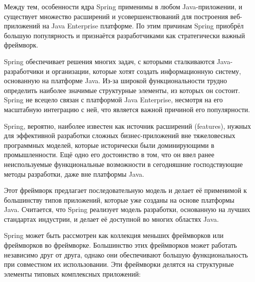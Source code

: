 Между тем, особенности ядра Spring применимы в любом Java-приложении, и существует множество расширений и усовершенствований для построения веб-приложений на Java Enterprise платформе. По этим причинам Spring приобрёл большую популярность и признаётся разработчиками как стратегически важный фреймворк.

Spring обеспечивает решения многих задач, с которыми сталкиваются Java-разработчики и организации, которые хотят создать информационную систему, основанную на платформе Java. Из-за широкой функциональности трудно определить наиболее значимые структурные элементы, из которых он состоит. Spring не всецело связан с платформой Java Enterprise, несмотря на его масштабную интеграцию с ней, что является важной причиной его популярности.

Spring, вероятно, наиболее известен как источник расширений (features), нужных для эффективной разработки сложных бизнес-приложений вне тяжеловесных программных моделей, которые исторически были доминирующими в промышленности. Ещё одно его достоинство в том, что он ввел ранее неиспользуемые функциональные возможности в сегодняшние господствующие методы разработки, даже вне платформы Java.

Этот фреймворк предлагает последовательную модель и делает её применимой к большинству типов приложений, которые уже созданы на основе платформы Java. Считается, что Spring реализует модель разработки, основанную на лучших стандартах индустрии, и делает её доступной во многих областях Java.

Spring может быть рассмотрен как коллекция меньших фреймворков или фреймворков во фреймворке. Большинство этих фреймворков может работать независимо друг от друга, однако они обеспечивают большую функциональность при совместном их использовании. Эти фреймворки делятся на структурные элементы типовых комплексных приложений:

